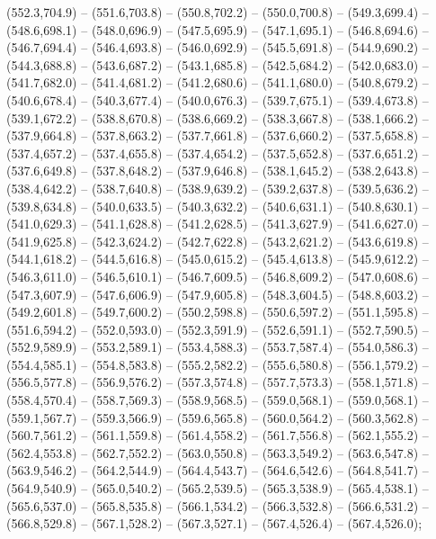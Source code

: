 (552.3,704.9) -- (551.6,703.8) -- (550.8,702.2) -- (550.0,700.8) -- (549.3,699.4) -- (548.6,698.1) -- (548.0,696.9) -- (547.5,695.9) -- (547.1,695.1) -- (546.8,694.6) -- (546.7,694.4) -- (546.4,693.8) -- (546.0,692.9) -- (545.5,691.8) -- (544.9,690.2) -- (544.3,688.8) -- (543.6,687.2) -- (543.1,685.8) -- (542.5,684.2) -- (542.0,683.0) -- (541.7,682.0) -- (541.4,681.2) -- (541.2,680.6) -- (541.1,680.0) -- (540.8,679.2) -- (540.6,678.4) -- (540.3,677.4) -- (540.0,676.3) -- (539.7,675.1) -- (539.4,673.8) -- (539.1,672.2) -- (538.8,670.8) -- (538.6,669.2) -- (538.3,667.8) -- (538.1,666.2) -- (537.9,664.8) -- (537.8,663.2) -- (537.7,661.8) -- (537.6,660.2) -- (537.5,658.8) -- (537.4,657.2) -- (537.4,655.8) -- (537.4,654.2) -- (537.5,652.8) -- (537.6,651.2) -- (537.6,649.8) -- (537.8,648.2) -- (537.9,646.8) -- (538.1,645.2) -- (538.2,643.8) -- (538.4,642.2) -- (538.7,640.8) -- (538.9,639.2) -- (539.2,637.8) -- (539.5,636.2) -- (539.8,634.8) -- (540.0,633.5) -- (540.3,632.2) -- (540.6,631.1) -- (540.8,630.1) -- (541.0,629.3) -- (541.1,628.8) -- (541.2,628.5) -- (541.3,627.9) -- (541.6,627.0) -- (541.9,625.8) -- (542.3,624.2) -- (542.7,622.8) -- (543.2,621.2) -- (543.6,619.8) -- (544.1,618.2) -- (544.5,616.8) -- (545.0,615.2) -- (545.4,613.8) -- (545.9,612.2) -- (546.3,611.0) -- (546.5,610.1) -- (546.7,609.5) -- (546.8,609.2) -- (547.0,608.6) -- (547.3,607.9) -- (547.6,606.9) -- (547.9,605.8) -- (548.3,604.5) -- (548.8,603.2) -- (549.2,601.8) -- (549.7,600.2) -- (550.2,598.8) -- (550.6,597.2) -- (551.1,595.8) -- (551.6,594.2) -- (552.0,593.0) -- (552.3,591.9) -- (552.6,591.1) -- (552.7,590.5) -- (552.9,589.9) -- (553.2,589.1) -- (553.4,588.3) -- (553.7,587.4) -- (554.0,586.3) -- (554.4,585.1) -- (554.8,583.8) -- (555.2,582.2) -- (555.6,580.8) -- (556.1,579.2) -- (556.5,577.8) -- (556.9,576.2) -- (557.3,574.8) -- (557.7,573.3) -- (558.1,571.8) -- (558.4,570.4) -- (558.7,569.3) -- (558.9,568.5) -- (559.0,568.1) -- (559.0,568.1) -- (559.1,567.7) -- (559.3,566.9) -- (559.6,565.8) -- (560.0,564.2) -- (560.3,562.8) -- (560.7,561.2) -- (561.1,559.8) -- (561.4,558.2) -- (561.7,556.8) -- (562.1,555.2) -- (562.4,553.8) -- (562.7,552.2) -- (563.0,550.8) -- (563.3,549.2) -- (563.6,547.8) -- (563.9,546.2) -- (564.2,544.9) -- (564.4,543.7) -- (564.6,542.6) -- (564.8,541.7) -- (564.9,540.9) -- (565.0,540.2) -- (565.2,539.5) -- (565.3,538.9) -- (565.4,538.1) -- (565.6,537.0) -- (565.8,535.8) -- (566.1,534.2) -- (566.3,532.8) -- (566.6,531.2) -- (566.8,529.8) -- (567.1,528.2) -- (567.3,527.1) -- (567.4,526.4) -- (567.4,526.0);
